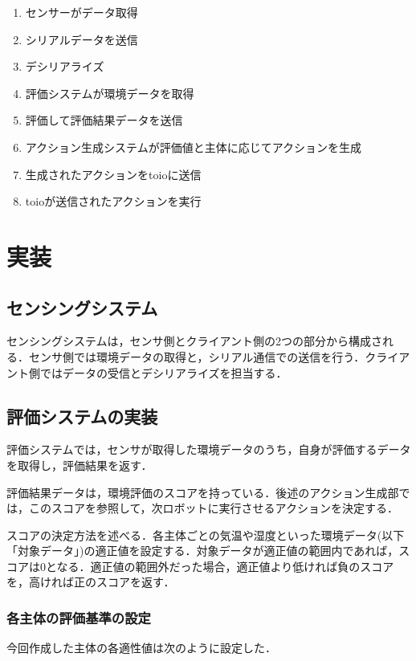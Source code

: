 \documentclass[paper=a4paper,jafontsize=9pt,head_space=15mm,gutter=20mm,
twocolumn,number_of_lines=49, line_length=26zw]{myuarticle}
\begin{document}
\begin{enumerate}
  \item センサーがデータ取得
  \item シリアルデータを送信
  \item デシリアライズ
  \item 評価システムが環境データを取得
  \item 評価して評価結果データを送信
  \item アクション生成システムが評価値と主体に応じてアクションを生成
  \item 生成されたアクションをtoioに送信
  \item toioが送信されたアクションを実行
\end{enumerate}

\section{実装}

\subsection{センシングシステム}
センシングシステムは，センサ側とクライアント側の2つの部分から構成される．センサ側では環境データの取得と，シリアル通信での送信を行う．クライアント側ではデータの受信とデシリアライズを担当する．

\subsection{評価システムの実装}
評価システムでは，センサが取得した環境データのうち，自身が評価するデータを取得し，評価結果を返す．

評価結果データは，環境評価のスコアを持っている．後述のアクション生成部では，このスコアを参照して，次ロボットに実行させるアクションを決定する．

スコアの決定方法を述べる．各主体ごとの気温や湿度といった環境データ(以下「対象データ」)の適正値を設定する．対象データが適正値の範囲内であれば，スコアは0となる．適正値の範囲外だった場合，適正値より低ければ負のスコアを，高ければ正のスコアを返す．

\subsubsection{各主体の評価基準の設定}
今回作成した主体の各適性値は次のように設定した．
\end{document}
